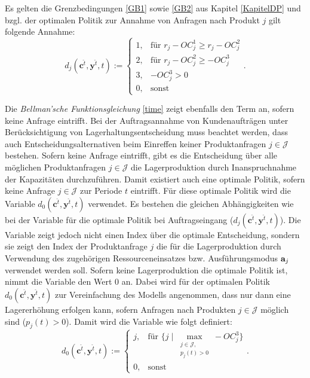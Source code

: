 Es gelten die Grenzbedingungen \eqref{GB1} sowie \eqref{GB2} aus Kapitel \ref{KapitelDP} und bzgl. der optimalen Politik zur Annahme von Anfragen nach Produkt $j$ gilt folgende Annahme:
\begin{equation}\label{GB3}
     d_{j}({\textbf{c}^{\hat t},\textbf{y}^{\hat t}, t}):=\left\{\begin{array}{llll}
     1, & \text{für } r_{j} - OC_{j}^{1} \ge r_{j} - OC_{j}^{2}\\
         2, & \text{für } r_{j} - OC_{j}^{2} \ge -OC_{j}^{3}\\
         3, & -OC_{j}^{3} > 0\\
         0, & \text{sonst}\end{array}\right. .
\end{equation}

Die \textit{Bellman'sche Funktionsgleichung} \eqref{time} zeigt ebenfalls den Term an, sofern keine Anfrage eintrifft. Bei der Auftragsannahme von Kundenaufträgen unter Berücksichtigung von Lagerhaltungsentscheidung muss beachtet werden, dass auch Entscheidungsalternativen beim Einreffen keiner Produktanfragen $j\in\mathcal{J} $ bestehen. Sofern keine Anfrage eintrifft, gibt es die Entscheidung über alle möglichen Produktanfragen $j\in\mathcal{J}$ die Lagerproduktion durch Inanspruchnahme der Kapazitäten durchzuführen. Damit existiert auch eine optimale Politik, sofern keine Anfrage $j\in\mathcal{J}$ zur Periode $t$ eintrifft. Für diese optimale Politik wird die Variable $d_0({\textbf{c}^{\hat t},\textbf{y}^{\hat t},t})$ verwendet. Es bestehen die gleichen Abhängigkeiten wie bei der Variable für die optimale Politik bei Auftragseingang ($d_j({\textbf{c}^{\hat t},\textbf{y}^{\hat t},t})$). Die Variable zeigt jedoch nicht einen Index über die optimale Entscheidung, sondern sie zeigt den Index der Produktanfrage $j$ die für die Lagerproduktion durch Verwendung des zugehörigen Ressourceneinsatzes bzw. Ausführungsmodus $\textbf a_j$ verwendet werden soll. Sofern keine Lagerproduktion die optimale Politik ist, nimmt die Variable den Wert $0$ an. Dabei wird für der optimalen Politik $d_0({\textbf{c}^{\hat t},\textbf{y}^{\hat t},t})$ zur Vereinfachung des Modells angenommen, dass nur dann eine Lagererhöhung erfolgen kann, sofern Anfragen nach Produkten $j\in\mathcal J$ möglich sind ($p_j(t)>0$). Damit wird die Variable wie folgt definiert:
\begin{equation}\label{GB4}
     d_{0}({\textbf{c}^{\hat t},\textbf{y}^{\hat t}, t}):=\left\{\begin{array}{ll}
         j, & \text{für }\{ j\; |\; \max_{\substack{j\in \mathcal{J},\\ p_j(t)>0}} -OC_{j}^{3}\}\\
         0, & \text{sonst}\end{array}\right. .
\end{equation}



